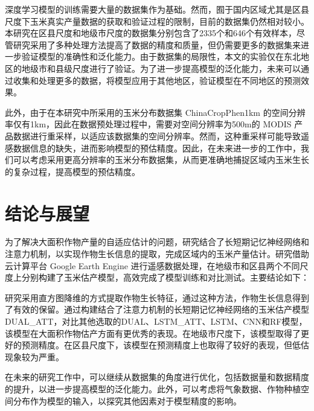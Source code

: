 \par 深度学习模型的训练需要大量的数据集作为基础。然而，囿于国内区域尤其是区县尺度下玉米真实产量数据的获取和验证过程的限制，目前的数据集仍然相对较小。本研究在区县尺度和地级市尺度的数据集分别包含了2335个和646个有效样本，尽管研究采用了多种处理方法提高了数据的精度和质量，但仍需要更多的数据集来进一步验证模型的准确性和泛化能力。由于数据集的局限性，本文的实验仅在东北地区的地级市和县级尺度进行了验证。为了进一步提高模型的泛化能力，未来可以通过收集和处理更多的数据，将模型应用于其他地区，验证模型在不同地区的预测效果。

\par 此外，由于在本研究中所采用的玉米分布数据集 ChinaCropPhen1km 的空间分辨率仅有1km，因此在数据预处理过程中，需要对空间分辨率为500m的 MODIS 产品数据进行重采样，以适应该数据集的空间分辨率。然而，这种重采样可能导致遥感数据信息的缺失，进而影响模型的预估精度。因此，在未来进一步的工作中，我们可以考虑采用更高分辨率的玉米分布数据集，从而更准确地捕捉区域内玉米生长的复杂过程，提高模型的预估精度。

\section{结论与展望}
\par 为了解决大面积作物产量的自适应估计的问题，研究结合了长短期记忆神经网络和注意力机制，以实现作物生长信息的提取，完成区域内的玉米产量估计。研究借助云计算平台 Google Earth Engine 进行遥感数据处理，在地级市和区县两个不同尺度上分别构建了玉米估产模型，高效完成了模型训练和对比测试。主要结论如下：

\par 研究采用直方图降维的方式提取作物生长特征，通过这种方法，作物生长信息得到了有效的保留。通过构建结合了注意力机制的长短期记忆神经网络的玉米估产模型DUAL\_ATT，对比其他选取的DUAL、LSTM\_ATT、LSTM、CNN和RF模型，该模型在大面积作物估产方面有更优秀的表现。在地级市尺度下，该模型取得了更好的预测精度。在区县尺度下，该模型在预测精度上也取得了较好的表现，但低估现象较为严重。

\par 在未来的研究工作中，可以继续从数据集的角度进行优化，包括数据量和数据精度的提升，以进一步提高模型的泛化能力。此外，可以考虑将气象数据、作物种植空间分布作为模型的输入，以探究其他因素对于模型精度的影响。